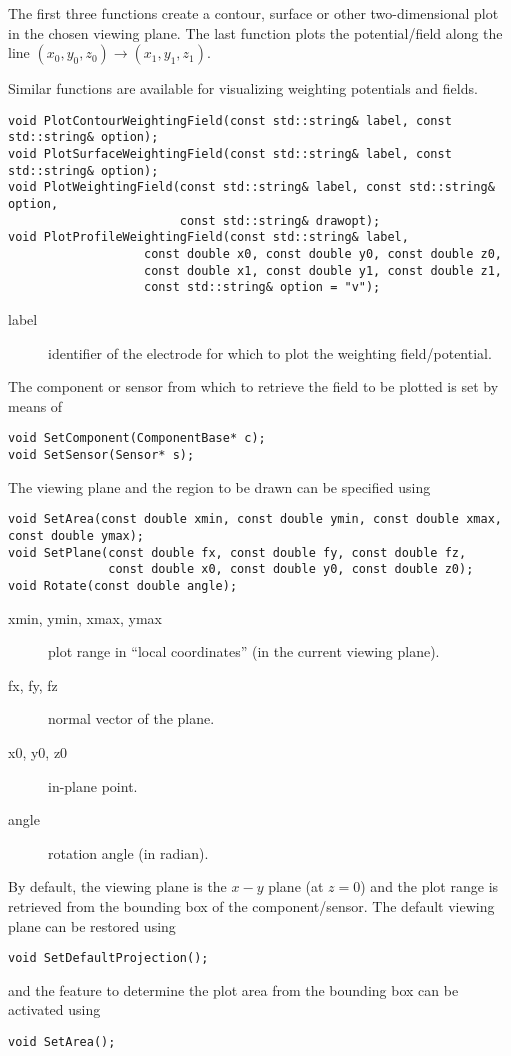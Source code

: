 The first three functions create a contour, surface or other two-dimensional plot in the chosen viewing plane.
The last function plots the potential/field along the line  
\(\left(x_{0}, y_{0}, z_{0}\right) \rightarrow 
  \left(x_{1}, y_{1}, z_{1}\right)\).

Similar functions are available for visualizing weighting potentials and fields.
\begin{lstlisting}
void PlotContourWeightingField(const std::string& label, const std::string& option);
void PlotSurfaceWeightingField(const std::string& label, const std::string& option);
void PlotWeightingField(const std::string& label, const std::string& option,
                        const std::string& drawopt);
void PlotProfileWeightingField(const std::string& label,
                   const double x0, const double y0, const double z0,
                   const double x1, const double y1, const double z1,
                   const std::string& option = "v");
\end{lstlisting}
\begin{description}
  \item[label] identifier of the electrode for which to plot the weighting field/potential.
\end{description}

The component or sensor from which to retrieve the field to be plotted 
is set by means of
\begin{lstlisting}
void SetComponent(ComponentBase* c);
void SetSensor(Sensor* s);
\end{lstlisting}

The viewing plane and the region to be drawn 
can be specified using
\begin{lstlisting}
void SetArea(const double xmin, const double ymin, const double xmax, const double ymax);
void SetPlane(const double fx, const double fy, const double fz,
              const double x0, const double y0, const double z0);
void Rotate(const double angle);
\end{lstlisting}
\begin{description}
  \item[xmin, ymin, xmax, ymax] plot range in ``local coordinates'' (in the current viewing plane).
  \item[fx, fy, fz] normal vector of the plane.
  \item[x0, y0, z0] in-plane point.
  \item[angle] rotation angle (in radian).
\end{description}
By default, the viewing plane is the $x-y$ plane (at $z = 0$) and the 
plot range is retrieved from the bounding box of the component/sensor.
The default viewing plane can be restored using 
\begin{lstlisting}
void SetDefaultProjection();
\end{lstlisting}
and the feature to determine the plot area from the bounding box can be activated using 
\begin{lstlisting}
void SetArea();
\end{lstlisting}
 
